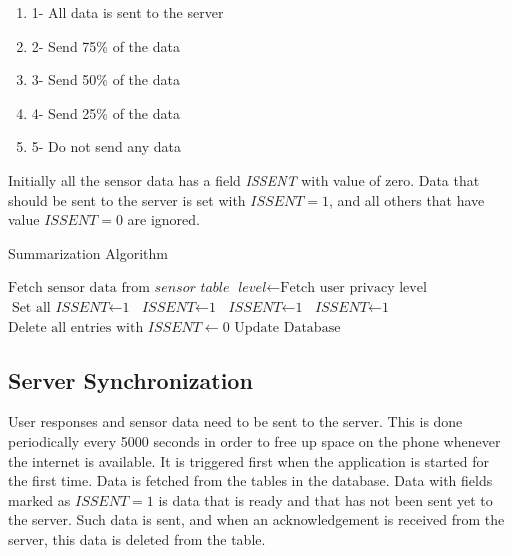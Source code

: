 \begin{enumerate}
	\item 1- All data is sent to the server
	\item 2- Send 75\% of the data
    \item 3- Send 50\% of the data
    \item 4- Send 25\% of the data
    \item 5- Do not send any data
\end{enumerate}

Initially all the sensor data has a field \textit{ISSENT} with value of zero. Data that should be sent to the server is set with $\textit{ISSENT}=1$, and all others that have value $\textit{ISSENT}=0$ are ignored.

\begin{algorithm}
\caption{Summarization Algorithm}\label{sum}
\begin{algorithmic}[1]
\State $\text{Fetch sensor data from } \textit{sensor table}$
\State $\textit{level} \gets \text{Fetch user privacy level}$
  \State $\text{Set all } \textit{ISSENT} \gets \text{1}$
 	 \State $\textit{ISSENT} \gets \text{1}$
 	\EndFor 
{}
 	 \State $\textit{ISSENT} \gets \text{1}$
 	\EndFor
{}
 	 \State $\textit{ISSENT} \gets \text{1}$
 	\EndFor
\EndIf
\State $\text{Delete all entries with } \textit{ISSENT} \gets 0$
\State $\text{Update Database}$
\EndFor
\EndProcedure
\end{algorithmic}
\end{algorithm}

\subsection{Server Synchronization} \label{job}

User responses and sensor data need to be sent to the server. This is done periodically every 5000 seconds in order to free up space on the phone whenever the internet is available. It is triggered first when the application is started for the first time. Data is fetched from the tables in the database. Data with fields marked as $\textit{ISSENT}=1$ is data that is ready and that has not been sent yet to the server. Such data is sent, and when an acknowledgement is received from the server, this data is deleted from the table.

